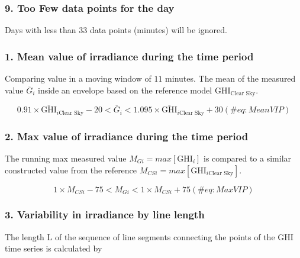 \documentclass[
  10pt,
  a4paper,oneside]{article}
\begin{document}
\hypertarget{too-few-data-points-for-the-day}{%
\subsubsection{9. Too Few data points for the day}\label{too-few-data-points-for-the-day}}

Days with less than \(33\) data points (minutes) will be ignored.

\hypertarget{mean-value-of-irradiance-during-the-time-period}{%
\subsubsection{1. Mean value of irradiance during the time period}\label{mean-value-of-irradiance-during-the-time-period}}

Comparing value in a moving window of \(11\) minutes.
The mean of the measured value \(\overline{G}_i\) inside an envelope based on the reference model \(\text{GHI}_\text{Clear Sky}\).

\begin{equation}
0.91 \times \overline{\text{GHI}}_{i\text{Clear Sky}} - 20
< \overline{G}_i <
1.095 \times \overline{\text{GHI}}_{i\text{Clear Sky}} + 30
(\#eq:MeanVIP)
\end{equation}

\hypertarget{max-value-of-irradiance-during-the-time-period}{%
\subsubsection{2. Max value of irradiance during the time period}\label{max-value-of-irradiance-during-the-time-period}}

The running max measured value \(M_{Gi} = max[\text{GHI}_{i}]\) is compared to a similar constructed value from the reference \(M_{CSi} = max[\text{GHI}_{i\text{Clear Sky}}]\).

\begin{equation}
1 \times M_{CSi} - 75
< M_{Gi} <
1 \times M_{CSi} + 75
(\#eq:MaxVIP)
\end{equation}

\hypertarget{variability-in-irradiance-by-line-length}{%
\subsubsection{3. Variability in irradiance by line length}\label{variability-in-irradiance-by-line-length}}

The length L of the sequence of line segments connecting the points of the GHI time
series is calculated by
\end{document}
